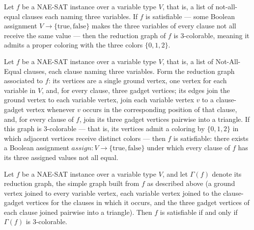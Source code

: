 \begin{lemma}
\label{NAEtoColor.NAEtoColorCompleteness}
\leanok
{}
Let $f$ be a NAE-SAT instance over a variable type $V$, that is, a list of not-all-equal
clauses each naming three variables. If $f$ is satisfiable — some Boolean assignment $V
\to \{\mathrm{true}, \mathrm{false}\}$ makes the three variables of every clause not all
receive the same value — then the reduction graph of $f$ is 3-colorable, meaning it
admits a proper coloring with the three colors $\{0, 1, 2\}$.
\end{lemma}

\begin{lemma}
\label{NAEtoColor.NAEtoColorSoundness}
\leanok
{}
Let $f$ be a NAE-SAT instance over a variable type $V$, that is, a list of Not-All-Equal
clauses, each clause naming three variables. Form the reduction graph associated to $f$:
its vertices are a single ground vertex, one vertex for each variable in $V$, and, for
every clause, three gadget vertices; its edges join the ground vertex to each variable
vertex, join each variable vertex $v$ to a clause-gadget vertex whenever $v$ occurs in
the corresponding position of that clause, and, for every clause of $f$, join its three
gadget vertices pairwise into a triangle. If this graph is 3-colorable — that is, its
vertices admit a coloring by $\{0,1,2\}$ in which adjacent vertices receive distinct
colors — then $f$ is satisfiable: there exists a Boolean assignment $\mathit{assign} : V
\to \{\mathrm{true},\mathrm{false}\}$ under which every clause of $f$ has its three
assigned values not all equal.
\end{lemma}

\begin{theorem}
\label{NAEtoColor.NAEtoColorReduction}
\leanok
{}
Let $f$ be a NAE-SAT instance over a variable type $V$, and let $\Gamma(f)$ denote its
reduction graph, the simple graph built from $f$ as described above (a ground vertex
joined to every variable vertex, each variable vertex joined to the clause-gadget
vertices for the clauses in which it occurs, and the three gadget vertices of each
clause joined pairwise into a triangle). Then $f$ is satisfiable if and only if
$\Gamma(f)$ is 3-colorable.
\end{theorem}

